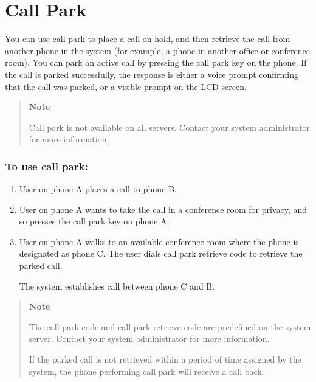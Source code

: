 \section{Call Park}

You can use call park to place a call on hold, and then retrieve the
call from another phone in the system (for example, a phone in another
office or conference room). You can park an active call by pressing the
call park key on the phone. If the call is parked successfully, the
response is either a voice prompt confirming that the call was parked,
or a visible prompt on the LCD screen.

\begin{quote}
	\textbf{Note}
	
	Call park is not available on all servers. Contact your system
	administrator for more information.
\end{quote}

\subsubsection{To use call park:}

\begin{enumerate}
	\item User on phone A places a call to phone B.
	\item User on phone A wants to take the call in a conference room for
		privacy, and so presses the call park key on phone A.
	\item User on phone A walks to an available conference room where the phone
		is designated as phone C. The user dials call park retrieve code to
		retrieve the parked call.

		The system establishes call between phone C and B.
\end{enumerate}

\begin{quote}
	\textbf{Note}
	
	The call park code and call park retrieve code are predefined on the
	system server. Contact your system administrator for more information.
	
	If the parked call is not retrieved within a period of time assigned by
	the system, the phone performing call park will receive a call back.
\end{quote}
